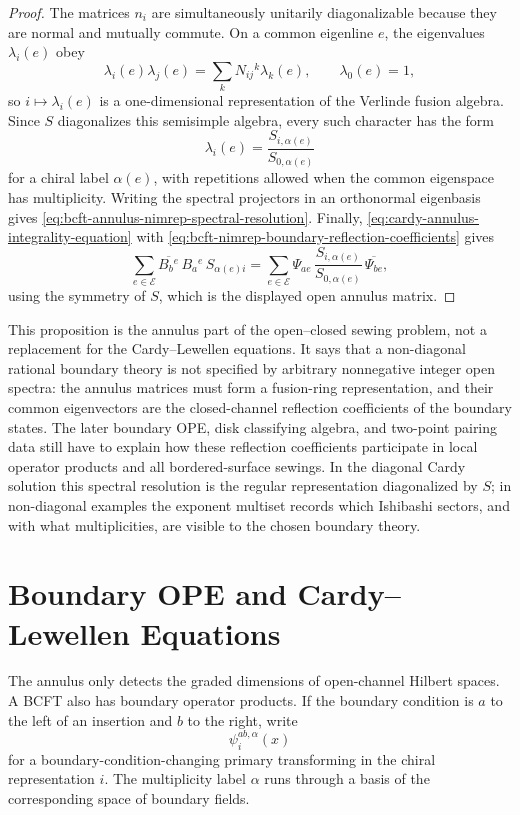 \begin{proof}
The matrices \(n_i\) are simultaneously unitarily diagonalizable because they
are normal and mutually commute.  On a common eigenline \(e\), the eigenvalues
\(\lambda_i(e)\) obey
\[
  \lambda_i(e)\lambda_j(e)
  =
  \sum_k N_{ij}{}^k\lambda_k(e),
  \qquad
  \lambda_0(e)=1,
\]
so \(i\mapsto\lambda_i(e)\) is a one-dimensional representation of the
Verlinde fusion algebra.  Since \(S\) diagonalizes this semisimple algebra,
every such character has the form
\[
  \lambda_i(e)=\frac{S_{i,\alpha(e)}}{S_{0,\alpha(e)}}
\]
for a chiral label \(\alpha(e)\), with repetitions allowed when the common
eigenspace has multiplicity.  Writing the spectral projectors in an
orthonormal eigenbasis gives
\eqref{eq:bcft-annulus-nimrep-spectral-resolution}.  Finally,
\eqref{eq:cardy-annulus-integrality-equation} with
\eqref{eq:bcft-nimrep-boundary-reflection-coefficients} gives
\[
  \sum_{e\in\mathcal E}
  \overline{B_b{}^e}\,B_a{}^e\,S_{\alpha(e)i}
  =
  \sum_{e\in\mathcal E}
  \Psi_{a e}\,
  \frac{S_{i,\alpha(e)}}{S_{0,\alpha(e)}}\,
  \overline{\Psi_{b e}},
\]
using the symmetry of \(S\), which is the displayed open annulus matrix.
\end{proof}

This proposition is the annulus part of the open--closed sewing problem, not a
replacement for the Cardy--Lewellen equations.  It says that a non-diagonal
rational boundary theory is not specified by arbitrary nonnegative integer
open spectra: the annulus matrices must form a fusion-ring representation, and
their common eigenvectors are the closed-channel reflection coefficients of
the boundary states.  The later boundary OPE, disk classifying algebra, and
two-point pairing data still have to explain how these reflection coefficients
participate in local operator products and all bordered-surface sewings.  In
the diagonal Cardy solution this spectral resolution is the regular
representation diagonalized by \(S\); in non-diagonal examples the exponent
multiset records which Ishibashi sectors, and with what multiplicities, are
visible to the chosen boundary theory.

\section{Boundary OPE and Cardy--Lewellen Equations}
\label{sec:bcft-boundary-ope-sewing}

The annulus only detects the graded dimensions of open-channel Hilbert
spaces.  A BCFT also has boundary operator products.  If the boundary
condition is \(a\) to the left of an insertion and \(b\) to the right, write
\[
  \psi^{ab,\alpha}_i(x)
\]
for a boundary-condition-changing primary transforming in the chiral
representation \(i\).  The multiplicity label \(\alpha\) runs through a
basis of the corresponding space of boundary fields.

